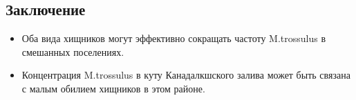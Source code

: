 \documentclass[a0,portrait]{a0poster}
\begin{document}
\begin{multicols}{2}
		\color{SaddleBrown} %
		
		\section*{Заключение}
		
		\begin{itemize}
			\item Оба вида хищников могут эффективно сокращать частоту M.trossulus в смешанных поселениях. 
			\item Концентрация M.trossulus в куту Канадалкшского залива может быть связана с малым обилием хищников в этом районе. 
		\end{itemize}
		
		\color{DarkSlateGray} %
		
		
		
		
	\end{multicols}
	
\end{document}
